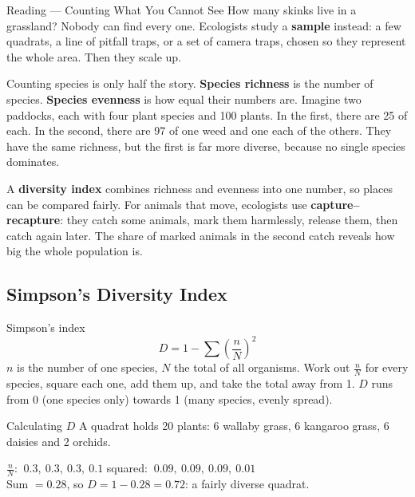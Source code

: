 \label{read:4}

\begin{readingbox}{Reading --- Counting What You Cannot See}
How many skinks live in a grassland? Nobody can find every one. Ecologists study a \textbf{sample} instead: a few quadrats, a line of pitfall traps, or a set of camera traps, chosen so they represent the whole area. Then they scale up.

Counting species is only half the story. \textbf{Species richness} is the number of species. \textbf{Species evenness} is how equal their numbers are. Imagine two paddocks, each with four plant species and 100 plants. In the first, there are 25 of each. In the second, there are 97 of one weed and one each of the others. They have the same richness, but the first is far more diverse, because no single species dominates.

A \textbf{diversity index} combines richness and evenness into one number, so places can be compared fairly. For animals that move, ecologists use \textbf{capture--recapture}: they catch some animals, mark them harmlessly, release them, then catch again later. The share of marked animals in the second catch reveals how big the whole population is.
\end{readingbox}

\rcreset
{}

\label{theory:4}

\subsection{Simpson's Diversity Index}\label{sub:a4.1}

\begin{skillbox}{Simpson's index}
\[ D = 1 - \sum\left(\frac{n}{N}\right)^2 \]
$n$ is the number of one species, $N$ the total of all organisms. Work out $\frac{n}{N}$ for every species, square each one, add them up, and take the total away from 1. $D$ runs from 0 (one species only) towards 1 (many species, evenly spread).
\end{skillbox}

\begin{workedex}{Calculating $D$}
A quadrat holds 20 plants: 6 wallaby grass, 6 kangaroo grass, 6 daisies and 2 orchids.

\smallskip
$\frac{n}{N}$: $\ 0.3,\ 0.3,\ 0.3,\ 0.1$ \quad squared: $\ 0.09,\ 0.09,\ 0.09,\ 0.01$\\
Sum $= 0.28$, so $D = 1 - 0.28 = \mathbf{0.72}$: a fairly diverse quadrat.
\end{workedex}

